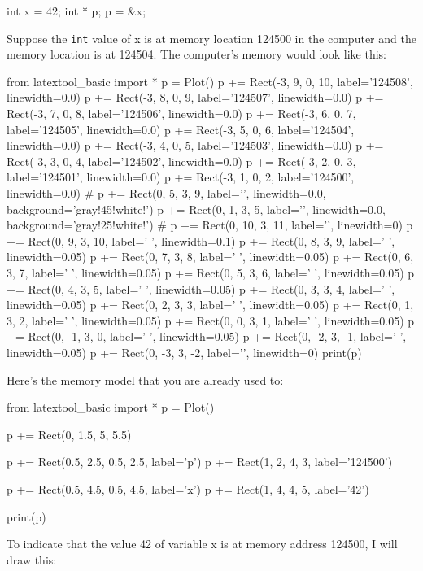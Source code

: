 \begin{consolethree}[escapeinside=||]
int x = 42;
int * p;
p = &x;
\end{consolethree}

Suppose the \texttt{int} value of x is at memory location 124500 in the computer and the memory location is at 124504. The computer's memory would look like this:
\begin{python}
from latextool_basic import *
p = Plot()
p += Rect(-3, 9, 0, 10, label='124508', linewidth=0.0)
p += Rect(-3, 8, 0, 9, label='124507', linewidth=0.0)
p += Rect(-3, 7, 0, 8, label='124506', linewidth=0.0)
p += Rect(-3, 6, 0, 7, label='124505', linewidth=0.0)
p += Rect(-3, 5, 0, 6, label='124504', linewidth=0.0)
p += Rect(-3, 4, 0, 5, label='124503', linewidth=0.0)
p += Rect(-3, 3, 0, 4, label='124502', linewidth=0.0)
p += Rect(-3, 2, 0, 3, label='124501', linewidth=0.0)
p += Rect(-3, 1, 0, 2, label='124500', linewidth=0.0)
#
p += Rect(0, 5, 3, 9, label='', linewidth=0.0, background='gray!45!white!')
p += Rect(0, 1, 3, 5, label='', linewidth=0.0, background='gray!25!white!')
#
p += Rect(0, 10, 3, 11, label='', linewidth=0)
p += Rect(0, 9, 3, 10, label=' ', linewidth=0.1)
p += Rect(0, 8, 3, 9, label=' ', linewidth=0.05)
p += Rect(0, 7, 3, 8, label=' ', linewidth=0.05)
p += Rect(0, 6, 3, 7, label=' ', linewidth=0.05)
p += Rect(0, 5, 3, 6, label=' ', linewidth=0.05)
p += Rect(0, 4, 3, 5, label=' ', linewidth=0.05)
p += Rect(0, 3, 3, 4, label=' ', linewidth=0.05)
p += Rect(0, 2, 3, 3, label=' ', linewidth=0.05)
p += Rect(0, 1, 3, 2, label=' ', linewidth=0.05)
p += Rect(0, 0, 3, 1, label=' ', linewidth=0.05)
p += Rect(0, -1, 3, 0, label=' ', linewidth=0.05)
p += Rect(0, -2, 3, -1, label=' ', linewidth=0.05)
p += Rect(0, -3, 3, -2, label='', linewidth=0)
print(p)
\end{python}

Here's the memory model that you are already used to:

\begin{python}
from latextool_basic import *
p = Plot()

p += Rect(0, 1.5, 5, 5.5)

p += Rect(0.5, 2.5, 0.5, 2.5, label='p')
p += Rect(1, 2, 4, 3, label='124500')

p += Rect(0.5, 4.5, 0.5, 4.5, label='x')
p += Rect(1, 4, 4, 5, label='42')

print(p)
\end{python}

To indicate that the value 42 of variable x is at memory address 124500,
I will draw this:

